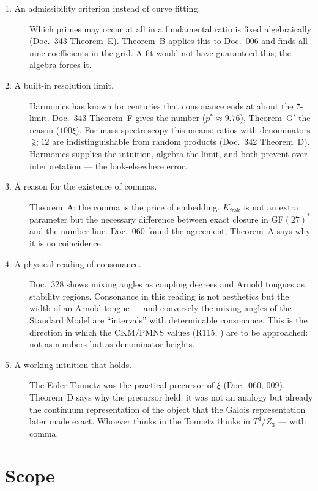 \begin{description}

\item[1. An admissibility criterion instead of curve fitting.]
  Which primes may occur at all in a fundamental ratio is fixed
  algebraically (Doc.~343 Theorem~E). Theorem~B applies this to Doc.~006
  and finds all nine coefficients in the grid. A fit would not have
  guaranteed this; the algebra forces it.

\item[2. A built-in resolution limit.]
  Harmonics has known for centuries that consonance ends at about the
  7-limit. Doc.~343 Theorem~F gives the number ($p^*\approx9.76$),
  Theorem~G$'$ the reason ($100\xi$). For mass spectroscopy this means:
  ratios with denominators $\gtrsim12$ are indistinguishable from random
  products (Doc.~342 Theorem~D). Harmonics supplies the intuition, algebra
  the limit, and both prevent over-interpretation --- the look-elsewhere error.

\item[3. A reason for the existence of commas.]
  Theorem~A: the comma is the price of embedding. $K_\text{frak}$ is not
  an extra parameter but the necessary difference between exact closure in
  GF$(27)^*$ and the number line. Doc.~060 found the agreement; Theorem~A
  says why it is no coincidence.

\item[4. A physical reading of consonance.]
  Doc.~328 shows mixing angles as coupling degrees and Arnold tongues as
  stability regions. Consonance in this reading is not aesthetics but the
  width of an Arnold tongue --- and conversely the mixing angles of the
  Standard Model are ``intervals'' with determinable consonance. This is
  the direction in which the CKM/PMNS values (R115, \SM) are to be
  approached: not as numbers but as denominator heights.

\item[5. A working intuition that holds.]
  The Euler Tonnetz was the practical precursor of $\xi$ (Doc.~060, 009).
  Theorem~D says why the precursor held: it was not an analogy but already
  the continuum representation of the object that the Galois representation
  later made exact. Whoever thinks in the Tonnetz thinks in $T^4/Z_3$ ---
  with comma.

\end{description}

\section{Scope}

